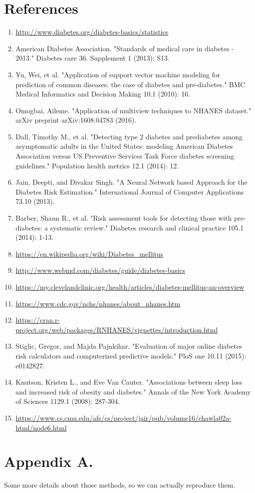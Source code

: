 \documentclass[twoside,11pt]{article}
\begin{document}
\section{References}
\begin{enumerate}
\item \url{http://www.diabetes.org/diabetes-basics/statistics}
\item American Diabetes Association. "Standards of medical care in diabetes - 2013." Diabetes care 36. Supplement 1 (2013): S13.
\item Yu, Wei, et al. "Application of support vector machine modeling for prediction of common diseases: the case of diabetes and pre-diabetes." BMC Medical Informatics and Decision Making 10.1 (2010): 16.
\item Omogbai, Aileme. "Application of multiview techniques to NHANES dataset." arXiv preprint arXiv:1608.04783 (2016).
\item Dall, Timothy M., et al. "Detecting type 2 diabetes and prediabetes among asymptomatic adults in the United States: modeling American Diabetes Association versus US Preventive Services Task Force diabetes screening guidelines." Population health metrics 12.1 (2014): 12.
\item Jain, Deepti, and Divakar Singh. "A Neural Network based Approach for the Diabetes Risk Estimation." International Journal of Computer Applications 73.10 (2013).
\item Barber, Shaun R., et al. "Risk assessment tools for detecting those with pre-diabetes: a systematic review." Diabetes research and clinical practice 105.1 (2014): 1-13.
\item \url{https://en.wikipedia.org/wiki/Diabetes_mellitus}
\item \url{http://www.webmd.com/diabetes/guide/diabetes-basics}
\item \url{https://my.clevelandclinic.org/health/articles/diabetes-mellitus-an-overview}
\item \url{https://www.cdc.gov/nchs/nhanes/about_nhanes.htm}
\item \url{https://cran.r-project.org/web/packages/RNHANES/vignettes/introduction.html}
\item Stiglic, Gregor, and Majda Pajnkihar. "Evaluation of major online diabetes risk calculators and computerized predictive models." PloS one 10.11 (2015): e0142827.
\item Knutson, Kristen L., and Eve Van Cauter. "Associations between sleep loss and increased risk of obesity and diabetes." Annals of the New York Academy of Sciences 1129.1 (2008): 287-304.
\item \url{https://www.cs.cmu.edu/afs/cs/project/jair/pub/volume16/chawla02a-html/node6.html}
\end{enumerate}


\appendix
\section*{Appendix A.}
Some more details about those methods, so we can actually reproduce them.
\end{document}
